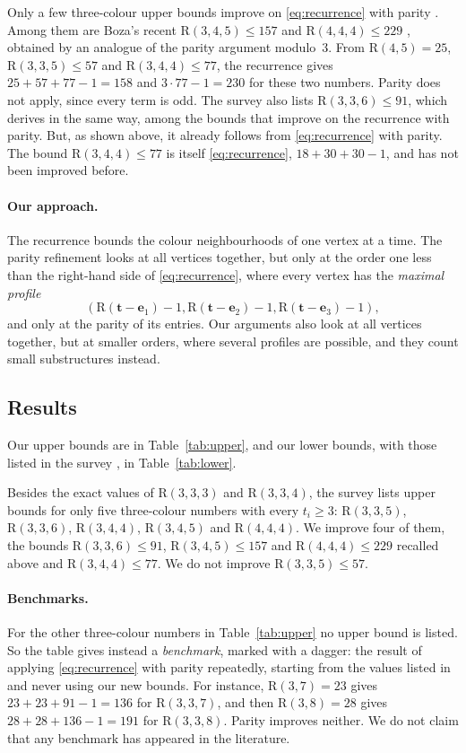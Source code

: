 \documentclass[11pt]{article}
\theoremstyle{spacedplain}
\theoremstyle{spaceddef}
\theoremstyle{spacedremark}
\newcommand{\R}{\mathrm{R}}
\newcommand{\bt}{\mathbf{t}}
\newcommand{\e}{\mathbf{e}}
\begin{document}
Only a few three-colour upper bounds improve on \eqref{eq:recurrence} with parity \cite{Rad26}.
Among them are Boza's recent $\R(3,4,5)\le 157$ and $\R(4,4,4)\le 229$ \cite{Boz26}, obtained by an analogue of the parity argument modulo~$3$.
From $\R(4,5)=25$, $\R(3,3,5)\le 57$ and $\R(3,4,4)\le 77$, the recurrence gives $25+57+77-1=158$ and $3\cdot 77-1=230$ for these two numbers.
Parity does not apply, since every term is odd.
The survey also lists $\R(3,3,6)\le 91$, which \cite{Boz26} derives in the same way, among the bounds that improve on the recurrence with parity.
But, as shown above, it already follows from \eqref{eq:recurrence} with parity.
The bound $\R(3,4,4)\le 77$ is itself \eqref{eq:recurrence}, $18+30+30-1$, and has not been improved before.

\paragraph{Our approach.}
The recurrence bounds the colour neighbourhoods of one vertex at a time.
The parity refinement looks at all vertices together, but only at the order one less than the right-hand side of \eqref{eq:recurrence}, where every vertex has the \emph{maximal profile}
\[
(\R(\bt-\e_1)-1,\R(\bt-\e_2)-1,\R(\bt-\e_3)-1),
\]
and only at the parity of its entries.
Our arguments also look at all vertices together, but at smaller orders, where several profiles are possible, and they count small substructures instead.

\subsection{Results}

Our upper bounds are in Table~\ref{tab:upper}, and our lower bounds, with those listed in the survey \cite{Rad26}, in Table~\ref{tab:lower}.

Besides the exact values of $\R(3,3,3)$ and $\R(3,3,4)$, the survey lists upper bounds for only five three-colour numbers with every $t_i\ge 3$: $\R(3,3,5)$, $\R(3,3,6)$, $\R(3,4,4)$, $\R(3,4,5)$ and $\R(4,4,4)$.
We improve four of them, the bounds $\R(3,3,6)\le 91$, $\R(3,4,5)\le 157$ and $\R(4,4,4)\le 229$ recalled above and $\R(3,4,4)\le 77$.
We do not improve $\R(3,3,5)\le 57$.

\paragraph{Benchmarks.}
For the other three-colour numbers in Table~\ref{tab:upper} no upper bound is listed.
So the table gives instead a \emph{benchmark}, marked with a dagger: the result of applying \eqref{eq:recurrence} with parity repeatedly, starting from the values listed in \cite{Rad26,Boz26} and never using our new bounds.
For instance, $\R(3,7)=23$ gives $23+23+91-1=136$ for $\R(3,3,7)$, and then $\R(3,8)=28$ gives $28+28+136-1=191$ for $\R(3,3,8)$.
Parity improves neither.
We do not claim that any benchmark has appeared in the literature.
\end{document}

